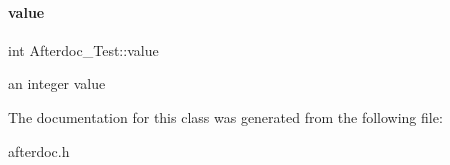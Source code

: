 \paragraph{\texorpdfstring{value}{value}}
{\footnotesize\ttfamily int Afterdoc\+\_\+\+Test\+::value\hspace{0.3cm}{\ttfamily [protected]}}

an integer value 

The documentation for this class was generated from the following file\+:\begin{DoxyCompactItemize}
\item 
afterdoc.\+h\end{DoxyCompactItemize}
